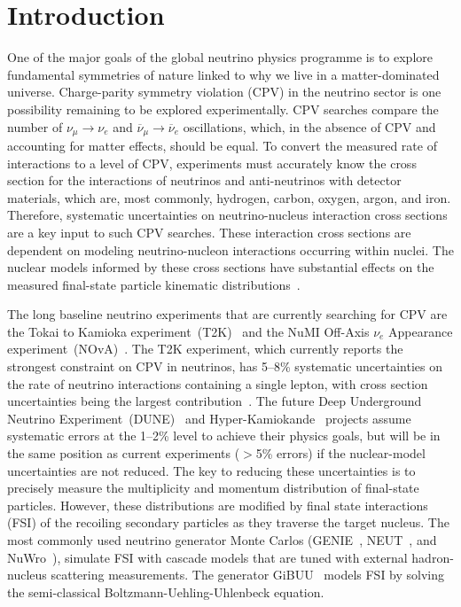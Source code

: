\section{Introduction}
One of the major goals of the global neutrino physics programme is to explore fundamental symmetries of nature linked to why we live in a matter-dominated universe. 
Charge-parity symmetry violation (CPV) in the neutrino sector is one possibility remaining to be explored experimentally. 
CPV searches compare the number of $\nu_{\mu}\!\rightarrow\!\nu_e$ and $\overline{\nu}_{\mu}\!\rightarrow\!\overline{\nu}_e$ oscillations, which, in the absence of CPV and accounting for matter effects, should be equal. 
To convert the measured rate of interactions to a level of CPV, experiments must accurately know the cross section for the interactions of neutrinos and anti-neutrinos with detector materials, which are, most commonly, hydrogen, carbon, oxygen, argon, and iron. 
Therefore, systematic uncertainties on neutrino-nucleus interaction cross sections are a key input to such CPV searches.  
These interaction cross sections are dependent on modeling neutrino-nucleon interactions occurring within nuclei. 
The nuclear models informed by these cross sections have substantial effects on the measured final-state particle kinematic distributions~\cite{Mosel:2016cwa}.

The long baseline neutrino experiments that are currently searching for CPV are the Tokai to Kamioka experiment~(T2K)~\cite{Abe:2019vii} and the NuMI Off-Axis $\nu_{e}$ Appearance experiment~(NOvA)~\cite{Acero:2019ksn}.
The T2K experiment, which currently reports the strongest constraint on CPV in neutrinos, has 5--8\% systematic uncertainties on the rate of neutrino interactions containing a single lepton, with cross section uncertainties being the largest contribution~\cite{Abe:2019vii}.
The future Deep Underground Neutrino Experiment~(DUNE)~\cite{abi2020deep} and Hyper-Kamiokande~\cite{abe2011letter} projects assume systematic errors at the 1--2\% level to achieve their physics goals, but will be in the same position as current experiments ($>$5\% errors) if the nuclear-model uncertainties are not reduced.  
The key to reducing these uncertainties is to precisely measure the multiplicity and momentum distribution of final-state particles. 
However, these distributions are modified by final state interactions (FSI) of the recoiling secondary particles as they traverse the target nucleus. 
The most commonly used neutrino generator Monte Carlos (GENIE~\cite{Andreopoulos:2009rq}, NEUT~\cite{Hayato:2009zz}, and NuWro~\cite{GOLAN2012499}), simulate FSI with cascade models that are tuned with external hadron-nucleus scattering measurements. The generator GiBUU~\cite{lalakulich2013neutrino} models FSI by solving the semi-classical Boltzmann-Uehling-Uhlenbeck equation.

